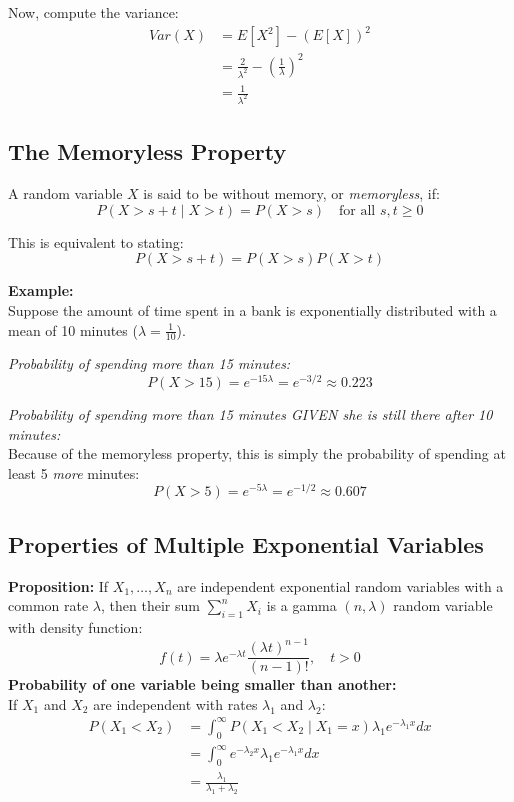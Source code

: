 Now, compute the variance:
\begin{align*}
Var(X) &= E[X^2] - (E[X])^2 \\
&= \frac{2}{\lambda^2} - \left(\frac{1}{\lambda}\right)^2 \\
&= \frac{1}{\lambda^2}
\end{align*}

\subsection{\textcolor{secondary}{The Memoryless Property}}
A random variable $X$ is said to be without memory, or \textit{memoryless}, if:
\[ P(X > s+t \mid X > t) = P(X > s) \quad \text{for all } s, t \ge 0 \]

This is equivalent to stating:
\[ P(X > s+t) = P(X > s)P(X > t) \]

\textbf{Example:} \\
Suppose the amount of time spent in a bank is exponentially distributed with a mean of 10 minutes ($\lambda = \frac{1}{10}$). 

\textit{Probability of spending more than 15 minutes:}
\[ P(X > 15) = e^{-15\lambda} = e^{-3/2} \approx 0.223 \]

\textit{Probability of spending more than 15 minutes GIVEN she is still there after 10 minutes:}\\
Because of the memoryless property, this is simply the probability of spending at least 5 \textit{more} minutes:
\[ P(X > 5) = e^{-5\lambda} = e^{-1/2} \approx 0.607 \]

\vspace{0.5cm}

\subsection{\textcolor{primary}{Properties of Multiple Exponential Variables}}
\textbf{Proposition:} If $X_1, \dots, X_n$ are independent exponential random variables with a common rate $\lambda$, then their sum $\sum_{i=1}^{n} X_i$ is a gamma $(n, \lambda)$ random variable with density function:
\[ f(t) = \lambda e^{-\lambda t} \frac{(\lambda t)^{n-1}}{(n-1)!}, \quad t > 0 \]
\textbf{Probability of one variable being smaller than another:} \\
If $X_1$ and $X_2$ are independent with rates $\lambda_1$ and $\lambda_2$:
\begin{align*}
P(X_1 < X_2) &= \int_{0}^{\infty} P(X_1 < X_2 \mid X_1 = x)\lambda_1 e^{-\lambda_1 x} dx \\
&= \int_{0}^{\infty} e^{-\lambda_2 x} \lambda_1 e^{-\lambda_1 x} dx \\
&= \frac{\lambda_1}{\lambda_1 + \lambda_2}
\end{align*}

